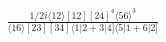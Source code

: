\documentclass[varwidth, border=5pt]{standalone}
\begin{document}
\begin{my}
$\begin{gathered}
\scriptscriptstyle\frac{1/2i\langle12\rangle[12][24]^4\langle56\rangle^3}{\langle16\rangle[23][34]\langle1|2+3|4]\langle5|1+6|2]}
\end{gathered}$
\end{my}
\end{document}
